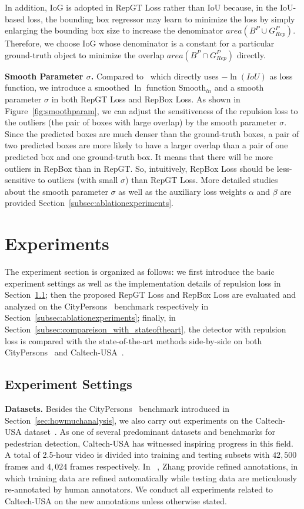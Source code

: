 \documentclass[10pt,twocolumn,letterpaper]{article}
\newcommand{\myparagraph}[1]{{\vspace{0.5em} \noindent \bf #1}}
\begin{document}
In addition, IoG is adopted in RepGT Loss rather than IoU because, in the IoU-based loss, the bounding box regressor may learn to minimize the loss by simply enlarging the bounding box size to increase the denominator $area(B^P \cup G_{Rep}^P)$. Therefore, we choose IoG whose denominator is a constant for a particular ground-truth object to minimize the overlap $area(B^P \cap G_{Rep}^P)$ directly.


\myparagraph{Smooth Parameter $\sigma$.}
Compared to~\cite{yu2016unitbox} which directly uses $-\ln(IoU)$ as loss function, we introduce a smoothed $\ln$ function $\mathrm{Smooth}_{ln}$ and a smooth parameter $\sigma$ in both RepGT Loss and RepBox Loss. As shown in Figure~\ref{fig:smoothparam}, we can adjust the sensitiveness of the repulsion loss to the outliers (the pair of boxes with large overlap) by the smooth parameter $\sigma$. Since the predicted boxes are much denser than the ground-truth boxes, a pair of two predicted boxes are more likely to have a larger overlap than a pair of one predicted box and one ground-truth box. It means that there will be more outliers in RepBox than in RepGT. So, intuitively, RepBox Loss should be less-sensitive to outliers (with small $\sigma$) than RepGT Loss. More detailed studies about the smooth parameter $\sigma$ as well as the auxiliary loss weights $\alpha$ and $\beta$ are provided Section~\ref{subsec:ablationexperiments}.

\section{Experiments}
\label{sec:exp}
The experiment section is organized as follows: we first introduce the basic experiment settings as well as the implementation details of repulsion loss in Section~\ref{subsec:implementation_details}; then the proposed RepGT Loss and RepBox Loss are evaluated and analyzed on the CityPersons~\cite{zhang2017citypersons} benchmark respectively in Section~\ref{subsec:ablationexperiments}; finally, in Section~\ref{subsec:compareison_with_stateoftheart}, the detector with repulsion loss is compared with the state-of-the-art methods side-by-side on both CityPersons~\cite{zhang2017citypersons} and Caltech-USA~\cite{dollar2009pedestrian}.

\subsection{Experiment Settings}
\label{subsec:implementation_details}
\myparagraph{Datasets.} Besides the CityPersons~\cite{zhang2017citypersons} benchmark introduced in Section~\ref{sec:howmuchanalysis}, we also carry out experiments on the Caltech-USA dataset~\cite{dollar2009pedestrian}. As one of several predominant datasets and benchmarks for pedestrian detection, Caltech-USA has witnessed inspiring progress in this field.
A total of 2.5-hour video is divided into training and testing subsets with $42,500$ frames and $4,024$ frames respectively. In ~\cite{zhang2016far}, Zhang \etal provide refined annotations, in which training data are refined automatically while testing data are meticulously re-annotated by human annotators. We conduct all experiments related to Caltech-USA on the new annotations unless otherwise stated.
\end{document}
